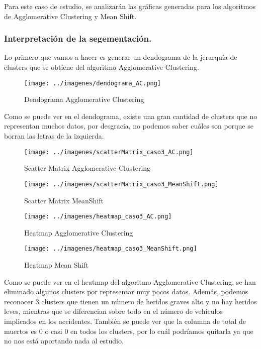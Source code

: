 	\vspace{0.06in}
	Para este caso de estudio, se analizarán las gráficas generadas para los algoritmos de Agglomerative Clustering y Mean Shift.

	\subsubsection{Interpretación de la segementación.}
	
	Lo primero que vamos a hacer es generar un dendograma de la jerarquía de clusters que se obtiene del algoritmo Agglomerative Clustering.
	
	\begin{figure}[H]
		\centering
		\texttt{[image: ../imagenes/dendograma\_AC.png]}
		\caption{Dendograma Agglomerative Clustering}
		\label{fig:dendogram_caso3_AC}
	\end{figure}

	\vspace{0.06in}
	Como se puede ver en el dendograma, existe una gran cantidad de clusters que no representan muchos datos, por desgracia, no podemos saber cuáles son porque se borran las letras de la izquierda.
	
	\begin{figure}[H]
		\centering
		\texttt{[image: ../imagenes/scatterMatrix\_caso3\_AC.png]}
		\caption{Scatter Matrix Agglomerative Clustering}
		\label{fig:scatter_caso3_AC}
	\end{figure}
	
	\begin{figure}[H]
		\centering
		\texttt{[image: ../imagenes/scatterMatrix\_caso3\_MeanShift.png]}
		\caption{Scatter Matrix MeanShift}
		\label{fig:scatter_caso3_MS}
	\end{figure}
	
	\begin{figure}[H]
		\centering
		\texttt{[image: ../imagenes/heatmap\_caso3\_AC.png]}
		\caption{Heatmap Agglomerative Clustering}
		\label{fig:hm_caso3_AC}
	\end{figure}
	
	\begin{figure}[H]
		\centering
		\texttt{[image: ../imagenes/heatmap\_caso3\_MeanShift.png]}
		\caption{Heatmap Mean Shift}
		\label{fig:hm_caso3_MS}
	\end{figure}

	\vspace{0.06in}
	Como se puede ver en el heatmap del algoritmo Agglomerative Clustering, se han eliminado algunos clusters por representar muy pocos datos. Además, podemos reconocer 3 clusters que tienen un número de heridos graves alto y no hay heridos leves, mientras que se diferencian sobre todo en el número de vehículos implicados en los accidentes. También se puede ver que la columna de total de muertos es 0 o casi 0 en todos los clusters, por lo cuál podríamos quitarla ya que no nos está aportando nada al estudio.
	

